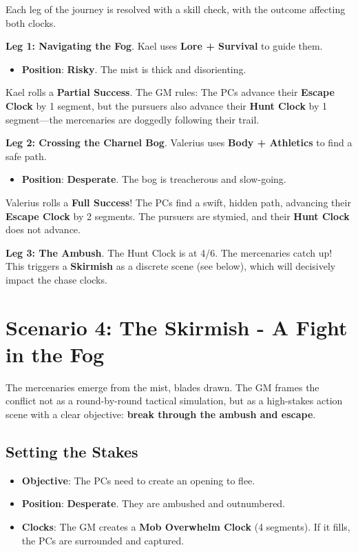 Each leg of the journey is resolved with a skill check, with the outcome affecting both clocks.

\textbf{Leg 1: Navigating the Fog}. Kael uses \textbf{Lore + Survival} to guide them.

\begin{itemize}
    \item \textbf{Position}: \textbf{Risky}. The mist is thick and disorienting.
\end{itemize}

Kael rolls a \textbf{Partial Success}. The GM rules: The PCs advance their \textbf{Escape Clock} by 1 segment, but the pursuers also advance their \textbf{Hunt Clock} by 1 segment---the mercenaries are doggedly following their trail.

\textbf{Leg 2: Crossing the Charnel Bog}. Valerius uses \textbf{Body + Athletics} to find a safe path.

\begin{itemize}
    \item \textbf{Position}: \textbf{Desperate}. The bog is treacherous and slow-going.
\end{itemize}

Valerius rolls a \textbf{Full Success}! The PCs find a swift, hidden path, advancing their \textbf{Escape Clock} by 2 segments. The pursuers are stymied, and their \textbf{Hunt Clock} does not advance.

\textbf{Leg 3: The Ambush}. The Hunt Clock is at 4/6. The mercenaries catch up! This triggers a \textbf{Skirmish} as a discrete scene (see below), which will decisively impact the chase clocks.

\section*{Scenario 4: The Skirmish - A Fight in the Fog}

The mercenaries emerge from the mist, blades drawn. The GM frames the conflict not as a round-by-round tactical simulation, but as a high-stakes action scene with a clear objective: \textbf{break through the ambush and escape}.

\subsection*{Setting the Stakes}

\begin{itemize}
    \item \textbf{Objective}: The PCs need to create an opening to flee.
    \item \textbf{Position}: \textbf{Desperate}. They are ambushed and outnumbered.
    \item \textbf{Clocks}: The GM creates a \textbf{Mob Overwhelm Clock} (4 segments). If it fills, the PCs are surrounded and captured.
\end{itemize}

